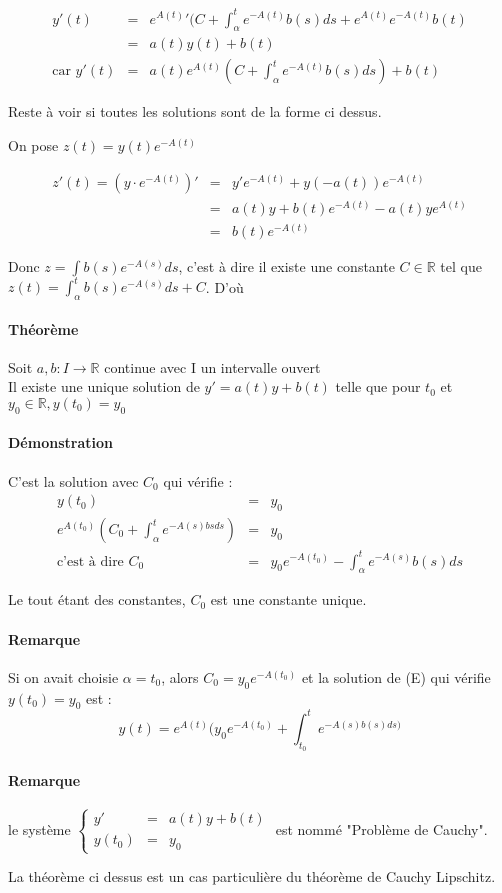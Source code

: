 	\[\begin{array}{rcl}
			y'(t) &=& {e^{A(t)}} '(C + \int_\alpha^t e^{-A(t)} b(s)ds + e^{A(t)} e^{-A(t)} b(t) \\
						   &=& a(t) y(t) + b(t) \\
	\text{car } y'(t) &=& a(t)e^{A(t)}(C + \int_\alpha^t e^{-A(t)}b(s)ds) + b(t)\end{array}\]

	Reste à voir si toutes les solutions sont de la forme ci dessus.

	On pose $z(t) = y(t) e^{-A(t)}$

	\[\begin{array}{rcl}
			z'(t) = (y\cdot e^{-A(t)})' &=& y'e^{-A(t)} + y(-a(t))e^{-A(t)} \\
				   &=& a(t)y + b(t)e^{-A(t)} - a(t)ye^{A(t)} \\
					  &=& b(t)e^{-A(t)} \end{array}\]

			Donc $z = \int b(s)e^{-A(s)} ds$, c'est à dire il existe une constante $C \in \mathbb{R}$ tel que $z(t) = \int_\alpha^t b(s)e^{-A(s)}ds + C$. D'où 
			\begin{center}
			\end{center}

			\paragraph{Théorème}
			Soit $a, b : I \rightarrow \mathbb{R}$ continue avec I un intervalle ouvert ~\\
			Il existe une unique solution de $y' = a(t) y + b(t)$ telle que pour $t_0$ et $y_0 \in \mathbb{R}, y(t_0) = y_0$

			\paragraph{Démonstration} C'est la solution avec $C_0$ qui vérifie : \[\begin{array}{rcl}
					y(t_0) &=& y_0 \\
					e^{A(t_0)}(C_0 + \int_\alpha^t e^{-A(s)bsds}) &=& y_0 \\
			\text{c'est à dire } C_0 &=& y_0e^{-A(t_0)} - \int_\alpha^t e^{-A(s)}b(s)ds\end{array}\]

Le tout étant des constantes, $C_0$ est une constante unique.

\paragraph{Remarque} Si on avait choisie $\alpha = t_0$, alors $C_0 = y_0e^{-A(t_0)}$ et la solution de (E) qui vérifie $y(t_0)=y_0$ est : \[y(t) = e^{A(t)}(y_0e^{-A(t_0)} + \int_{t_0}^t e^{-A(s)b(s) ds)}\]

\paragraph{Remarque} le système $\left\{\begin{array}{rcl} y' &=& a(t)y + b(t) \\
y(t_0) &=& y_0\end{array}\right.$ est nommé "Problème de Cauchy".

La théorème ci dessus est un cas particulière du théorème de Cauchy Lipschitz.
